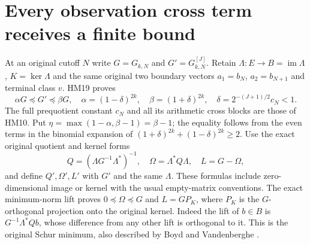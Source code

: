 \documentclass[11pt]{article}
\begin{document}
\section{Every observation cross term receives a finite bound}
At an original cutoff $N$ write $G=G_{k,N}$ and
$G'=G_{k,N}^{[J]}$. Retain $\Lambda:E\to B=\operatorname{im}\Lambda$,
$K=\ker\Lambda$ and the same original two boundary vectors
$a_1=b_N$, $a_2=b_{N+1}$ and terminal class $v$. HM19 proves
\begin{equation}\tag{HR1}
 \alpha G\preceq G'\preceq\beta G,
 \quad \alpha=(1-\delta)^{2k},\quad\beta=(1+\delta)^{2k},
 \quad\delta=2^{-(J+1)/2}c_N<1.
\end{equation}
The full prequotient constant $c_N$ and all its arithmetic cross blocks
are those of HM10. Put $\eta=\max(1-\alpha,\beta-1)=\beta-1$;
the equality follows from the even terms in the binomial expansion
of $(1+\delta)^{2k}+(1-\delta)^{2k}\ge2$.
Use the exact original quotient and kernel forms
\begin{equation}\tag{HR2}
 Q=(\Lambda G^{-1}\Lambda^*)^{-1},\quad
 \Omega=\Lambda^*Q\Lambda,\quad L=G-\Omega,
\end{equation}
and define $Q',\Omega',L'$ with $G'$ and the same $\Lambda$.
These formulas include zero-dimensional image or kernel with the
usual empty-matrix conventions. The exact minimum-norm lift proves
$0\preceq\Omega\preceq G$ and $L=GP_K$, where $P_K$ is the
$G$-orthogonal projection onto the original kernel. Indeed the lift
of $b\in B$ is $G^{-1}\Lambda^*Qb$, whose difference from any
other lift is orthogonal to it. This is the original Schur minimum,
also described by Boyd and Vandenberghe \cite[Appendix C.4.1]{hr:Boyd}.
\end{document}
